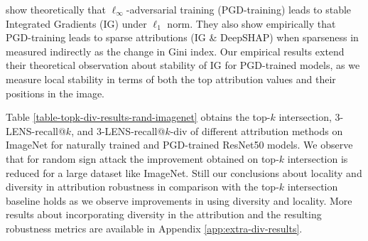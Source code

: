 \documentclass[letterpaper]{article} %
\begin{document}
\citet{ChalasaniC00J20} show theoretically that $\ell_{\infty}$-adversarial training (PGD-training) leads to stable Integrated Gradients (IG) under $\ell_{1}$ norm. They also show empirically that PGD-training leads to sparse attributions (IG \& DeepSHAP) when sparseness in measured indirectly as the change in Gini index. Our empirical results extend their theoretical observation about stability of IG for PGD-trained models, as we measure local stability in terms of both the top attribution values and their positions in the image.

Table \ref{table-topk-div-results-rand-imagenet} obtains the top-$k$ intersection, 3-LENS-recall@$k$, and 3-LENS-recall@$k$-div of different attribution methods on ImageNet for naturally trained and PGD-trained ResNet50 models. We observe that for random sign attack the improvement obtained on top-$k$ intersection is reduced for a large dataset like ImageNet. Still our conclusions about locality and diversity in attribution robustness in comparison with the top-$k$ intersection baseline holds as we observe improvements in using diversity and locality. 
More results about incorporating diversity in the attribution and the resulting robustness metrics are available in Appendix \ref{app:extra-div-results}.
%
\end{document}
